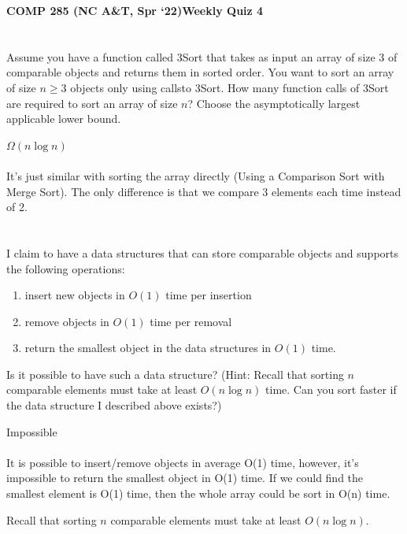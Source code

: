 \documentclass [12pt]{article}
\begin{document}
 

{\LARGE \textbf {COMP 285 (NC A\&T, Spr `22)}\hfill \textbf {Weekly Quiz 4} } 

\section{} Assume you have a function called 3Sort that takes as input an array of size 3 of comparable objects and returns them in sorted order. You want to sort an array of size $n \geq 3$ objects only using callsto 3Sort. How many function calls of 3Sort are required to sort an array of size $n$? Choose the asymptotically largest applicable lower bound.

\begin{Solution}
$\Omega(n \log n)$
\paragraph{} 
It's just similar with sorting the array directly (Using a Comparison Sort with Merge Sort). The only difference is that we compare 3 elements each time instead of 2.
\paragraph{} 


\end{Solution}


\section{} I claim to have a data structures that can store comparable objects and supports the following operations: 
\begin{enumerate}
    \item insert new objects in $O(1)$ time per insertion
    \item remove objects in $O(1)$ time per removal
    \item return the smallest object in the data structures in $O(1)$ time. 
\end{enumerate}

Is it possible to have such a data structure? (Hint: Recall that sorting $n$ comparable elements must take at least $O(n \log n)$ time. Can you sort faster if the data structure I described above exists?)

\begin{Solution}
Impossible
\paragraph{} 
It is possible to insert/remove objects in average O(1) time, however, it's impossible to return the smallest object in O(1) time. If we could find the smallest element is O(1) time, then the whole array could be sort in O(n) time.

Recall that sorting $n$ comparable elements must take at least $O(n \log n)$.
\end{Solution}
\end{document}
